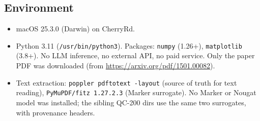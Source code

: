 \documentclass[11pt]{article}
\begin{document}
\subsection*{Environment}
\begin{itemize}
  \item macOS 25.3.0 (Darwin) on CherryRd.
  \item Python 3.11 (\texttt{/usr/bin/python3}). Packages: \texttt{numpy}
    (1.26+), \texttt{matplotlib} (3.8+). No LLM inference, no external API,
    no paid service. Only the paper PDF was downloaded (from
    \url{https://arxiv.org/pdf/1501.00082}).
  \item Text extraction: \texttt{poppler pdftotext -layout} (source of truth
    for text reading), \texttt{PyMuPDF/fitz 1.27.2.3} (Marker surrogate). No
    Marker or Nougat model was installed; the sibling QC-200 dirs use the same
    two surrogates, with provenance headers.
\end{itemize}
\end{document}
